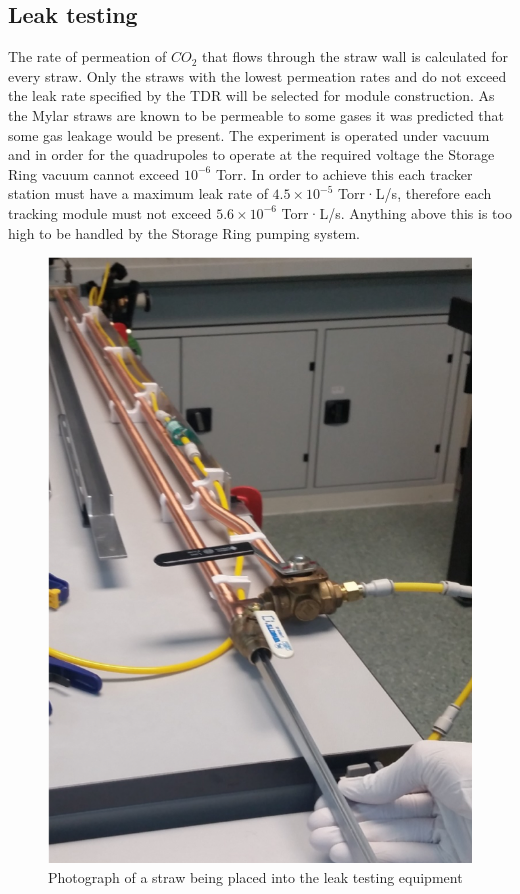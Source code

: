 \subsection {Leak testing}

The rate of permeation of $CO_{2}$ that flows through the straw wall is calculated for every straw. Only the straws with the lowest permeation rates and do not exceed the leak rate specified by the TDR will be selected for module construction. As the Mylar straws are known to be permeable to some gases it was predicted that some gas leakage would be present. The experiment is operated under vacuum and in order for the quadrupoles to operate at the required voltage the Storage Ring vacuum cannot exceed $10^{-6}$ Torr. In order to achieve this each tracker station must have a maximum leak rate of $4.5\times10^{-5}$ Torr·L/s, therefore each tracking module must not exceed $5.6\times10^{-6}$ Torr·L/s. Anything above this is too high to be handled by the Storage Ring pumping system.

\begin{figure}[h]
\centering
\includegraphics[scale=0.8]{Figures/leaktestsetup}
\decoRule
\caption{Photograph of a straw being placed into the leak testing equipment}
\label{fig:leaktestsetup}
\end{figure}

